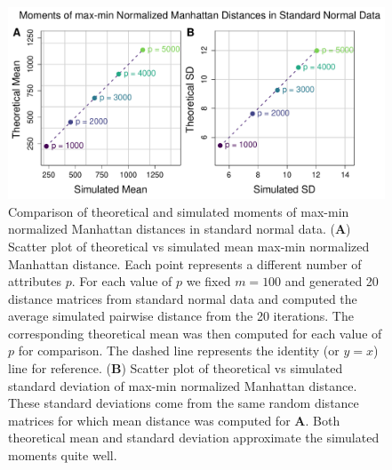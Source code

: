 \documentclass[10pt,letterpaper]{article}\usepackage[]{graphicx}\usepackage[]{color}
\begin{document}
\begin{figure}[H]
	\includegraphics[width=\textwidth]{compared_moments_normal_manhattan_max-min.pdf}
	\caption{Comparison of theoretical and simulated moments of max-min normalized Manhattan distances in standard normal data. (\textbf{A}) Scatter plot of theoretical vs simulated mean max-min normalized Manhattan distance. Each point represents a different number of attributes $p$. For each value of $p$ we fixed $m=100$ and generated 20 distance matrices from standard normal data and computed the average simulated pairwise distance from the 20 iterations. The corresponding theoretical mean was then computed for each value of $p$ for comparison. The dashed line represents the identity (or $y=x$) line for reference. (\textbf{B}) Scatter plot of theoretical vs simulated standard deviation of max-min normalized Manhattan distance. These standard deviations come from the same random distance matrices for which mean distance was computed for \textbf{A}. Both theoretical mean and standard deviation approximate the simulated moments quite well.}
\end{figure}
\end{document}
